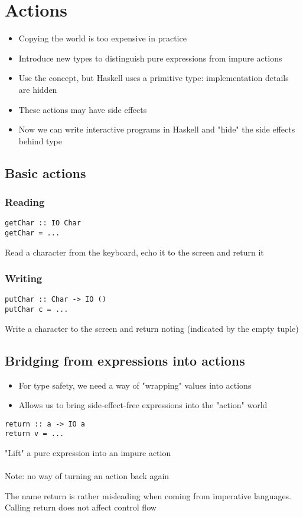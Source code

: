 \documentclass{article}[18pt]
\begin{document}
\section{Actions}
\begin{itemize}
	\item Copying the world is too expensive in practice
	\item Introduce new types to distinguish pure expressions from impure actions
	\item Use the concept, but Haskell uses a primitive type: implementation details are hidden
	\item These actions may have side effects
	\item Now we can write interactive programs in Haskell and "hide" the side effects behind type
\end{itemize}
\subsection{Basic actions}
\subsubsection{Reading}
\begin{verbatim}
getChar :: IO Char
getChar = ...
\end{verbatim}
Read a character from the keyboard, echo it to the screen and return it
\subsubsection{Writing}
\begin{verbatim}
putChar :: Char -> IO ()
putChar c = ...
\end{verbatim}
Write a character to the screen and return noting (indicated by the empty tuple)
\subsection{Bridging from expressions into actions}
\begin{itemize}
	\item For type safety, we need a way of "wrapping" values into actions
	\item Allows us to bring side-effect-free expressions into the "action" world
\end{itemize}
\begin{verbatim}
return :: a -> IO a
return v = ...
\end{verbatim}
"Lift" a pure expression into an impure action\\
\\
Note: no way of turning an action back again
\begin{important}[Return]
The name return is rather misleading when coming from imperative languages. Calling return does not affect control flow
\end{important}
\end{document}
